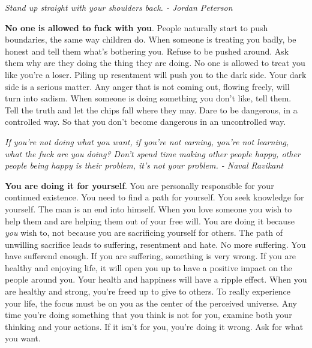 \documentclass[a4paper,hidelinks]{article}
\begin{document}
\newpage

\begin{center}
\textit{
Stand up straight with your shoulders back. - Jordan Peterson
}
\end{center}

\textbf{No one is allowed to fuck with you}.
People naturally start to push boundaries, the same way children do.
When someone is treating you badly, be honest and tell them what's bothering you.
Refuse to be pushed around.
Ask them why are they doing the thing they are doing.
No one is allowed to treat you like you're a loser.
Piling up resentment will push you to the dark side.
Your dark side is a serious matter.
Any anger that is not coming out, flowing freely, will turn into sadism.
When someone is doing something you don't like, tell them.
Tell the truth and let the chips fall where they may.
Dare to be dangerous, in a controlled way.
So that you don't become dangerous in an uncontrolled way.

\newpage

\begin{center}
\textit{
If you're not doing what you want, if you're not earning, you're not learning, what the fuck are you doing? Don't spend time making other people happy, other people being happy is their problem, it's not your problem. - Naval Ravikant
}
\end{center}

\textbf{You are doing it for yourself}.
You are personally responsible for your continued existence.
You need to find a path for yourself.
You seek knowledge for yourself.
The man is an end into himself.
When you love someone you wish to help them and are helping them out of your free will.
You are doing it because \textit{you} wish to, not because you are sacrificing yourself for others.
The path of unwilling sacrifice leads to suffering, resentment and hate.
No more suffering.
You have sufferend enough.
If you are suffering, something is very wrong.
If you are healthy and enjoying life, it will open you up to have a positive impact on the people around you.
Your health and happiness will have a ripple effect.
When you are healthy and strong, you’re freed up to give to others.
To really experience your life, the focus must be on you as the center of the perceived universe.
Any time you're doing something that you think is not for you, examine both your thinking and your actions.
If it isn't for you, you’re doing it wrong.
Ask for what you want.

\newpage
\end{document}
